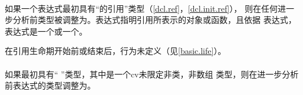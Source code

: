 \paragraph{} %
如果一个表达式最初具有“的引用”类型（\ref{dcl.ref}，\ref{dcl.init.ref}），
则在任何进一步分析前类型被调整为。表达式指明引用所表示的对象或函数，且依据
表达式，表达式是一个\lvalue{}或一个\xvalue{}。

\begin{note}
  在引用生命期开始前或结束后，行为未定义（见\ref{basic.life}）。
\end{note}

\paragraph{} %
如果\prvalue{}最初具有“ ”类型，其中是一个cv未限定非类，非数组
类型，则在进一步分析前表达式的类型调整为。

